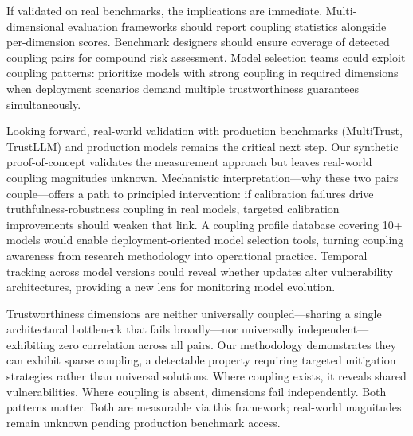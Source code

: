 If validated on real benchmarks, the implications are immediate. Multi-dimensional evaluation frameworks should report coupling statistics alongside per-dimension scores. Benchmark designers should ensure coverage of detected coupling pairs for compound risk assessment. Model selection teams could exploit coupling patterns: prioritize models with strong coupling in required dimensions when deployment scenarios demand multiple trustworthiness guarantees simultaneously.

Looking forward, real-world validation with production benchmarks (MultiTrust, TrustLLM) and production models remains the critical next step. Our synthetic proof-of-concept validates the measurement approach but leaves real-world coupling magnitudes unknown. Mechanistic interpretation---why these two pairs couple---offers a path to principled intervention: if calibration failures drive truthfulness-robustness coupling in real models, targeted calibration improvements should weaken that link. A coupling profile database covering 10+ models would enable deployment-oriented model selection tools, turning coupling awareness from research methodology into operational practice. Temporal tracking across model versions could reveal whether updates alter vulnerability architectures, providing a new lens for monitoring model evolution.

Trustworthiness dimensions are neither universally coupled---sharing a single architectural bottleneck that fails broadly---nor universally independent---exhibiting zero correlation across all pairs. Our methodology demonstrates they can exhibit sparse coupling, a detectable property requiring targeted mitigation strategies rather than universal solutions. Where coupling exists, it reveals shared vulnerabilities. Where coupling is absent, dimensions fail independently. Both patterns matter. Both are measurable via this framework; real-world magnitudes remain unknown pending production benchmark access.

